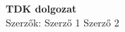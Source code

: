 \begin{titlepage}

\center
\vspace*{7.5cm}
{\huge \bfseries TDK dolgozat}\\[0.5cm]

{\LARGE Szerzők: {{Szerző 1}} {{Szerző 2}} }

\vfill

\end{titlepage}
